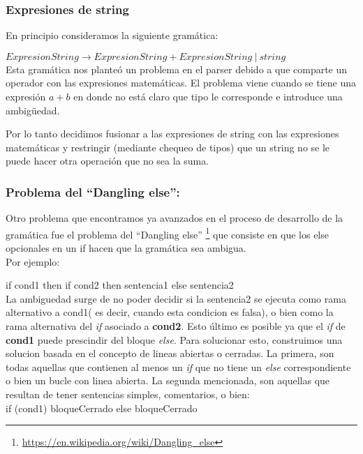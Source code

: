 \subsubsection{Expresiones de string}
En principio consideramos la siguiente gramática:

$ExpresionString \rightarrow ExpresionString + ExpresionString \ | \ string$ \\

Esta gramática nos planteó un problema en el parser debido a que comparte un operador con las expresiones matemáticas. El problema viene cuando se tiene una expresión $a+b$ en donde no está claro que tipo le corresponde e introduce una ambigüedad.

Por lo tanto decidimos fusionar a las expresiones de string con las expresiones matemáticas y restringir (mediante chequeo de tipos) que un string no se le puede hacer otra operación que no sea la suma.

\subsubsection{Problema del ``Dangling else'':}

Otro problema que encontramos ya avanzados en el proceso de desarrollo de la gramática fue el problema del ``Dangling else'' \footnote{\url{https://en.wikipedia.org/wiki/Dangling_else}} que consiste en que los else opcionales en un if hacen que la gramática sea ambigua. 
\\
Por ejemplo: 

if cond1 then if cond2 then sentencia1 else sentencia2 \\

La ambiguedad surge de no poder decidir si la sentencia2 se ejecuta como rama alternativo a cond1( es decir, cuando esta condicion es falsa), o bien como la rama alternativa del \textit{if} asociado a \textbf{cond2}. Esto último es posible ya que el \textit{if} de \textbf{cond1} puede prescindir del bloque \textit{else}.
Para solucionar esto, construimos una solucion basada en el concepto de lineas abiertas o cerradas. La primera, son todas aquellas que contienen al menos un \textit{if} que no tiene un \textit{else} correspondiente o bien un bucle con linea abierta. La segunda mencionada, son aquellas que resultan de tener sentencias simples, comentarios, o bien: \\

if (cond1) bloqueCerrado else bloqueCerrado \\

